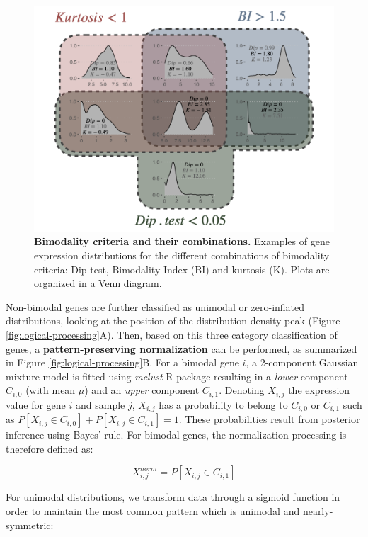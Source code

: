 \documentclass[a4paper,12pt,twoside,onecolumn,openright,final,oldfontcommands]{memoir}
\begin{document}
\begin{figure}

{\centering \includegraphics[width=0.8\linewidth]{fig/bimodality} 

}

\caption[Bimodality criteria and their combinations]{\textbf{Bimodality criteria and their
combinations.} Examples of gene expression distributions for the
different combinations of bimodality criteria: Dip test, Bimodality
Index (BI) and kurtosis (K). Plots are organized in a Venn diagram.}\label{fig:bimodality}
\end{figure}






Non-bimodal genes are further classified as unimodal or zero-inflated
distributions, looking at the position of the distribution density peak
(Figure \ref{fig:logical-processing}A). Then, based on this three
category classification of genes, a \textbf{pattern-preserving
normalization} can be performed, as summarized in Figure
\ref{fig:logical-processing}B. For a bimodal gene \(i\), a 2-component
Gaussian mixture model is fitted using \emph{mclust} R package resulting
in a \emph{lower} component \(C_{i,0}\) (with mean \(\mu\)) and an
\emph{upper} component \(C_{i,1}\). Denoting \(X_{i,j}\) the expression
value for gene \(i\) and sample \(j\), \(X_{i,j}\) has a probability to
belong to \(C_{i,0}\) or \(C_{i,1}\) such as
\(P[X_{i,j} \in C_{i,0}]+P[X_{i,j} \in C_{i,1}]=1\). These probabilities
result from posterior inference using Bayes' rule. For bimodal genes,
the normalization processing is therefore defined as:

\[X_{i,j}^{norm}=P[X_{i,j} \in C_{i,1}]\]

For unimodal distributions, we transform data through a sigmoid function
in order to maintain the most common pattern which is unimodal and
nearly-symmetric:
\end{document}
